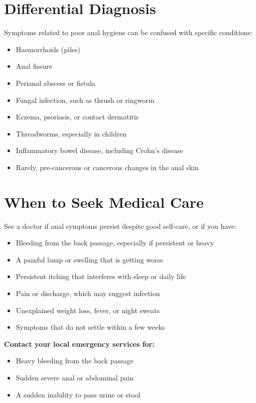 \section*{Differential Diagnosis}
Symptoms related to poor anal hygiene can be confused with specific conditions:
\begin{itemize}
    \item Haemorrhoids (piles)
    \item Anal fissure
    \item Perianal abscess or fistula
    \item Fungal infection, such as thrush or ringworm
    \item Eczema, psoriasis, or contact dermatitis
    \item Threadworms, especially in children
    \item Inflammatory bowel disease, including Crohn's disease
    \item Rarely, pre-cancerous or cancerous changes in the anal skin
\end{itemize}

\section*{When to Seek Medical Care}
See a doctor if anal symptoms persist despite good self-care, or if you have:
\begin{itemize}
    \item Bleeding from the back passage, especially if persistent or heavy
    \item A painful lump or swelling that is getting worse
    \item Persistent itching that interferes with sleep or daily life
    \item Pain or discharge, which may suggest infection
    \item Unexplained weight loss, fever, or night sweats
    \item Symptoms that do not settle within a few weeks
\end{itemize}

\textbf{Contact your local emergency services for:}
\begin{itemize}
    \item Heavy bleeding from the back passage
    \item Sudden severe anal or abdominal pain
    \item A sudden inability to pass urine or stool
\end{itemize}

